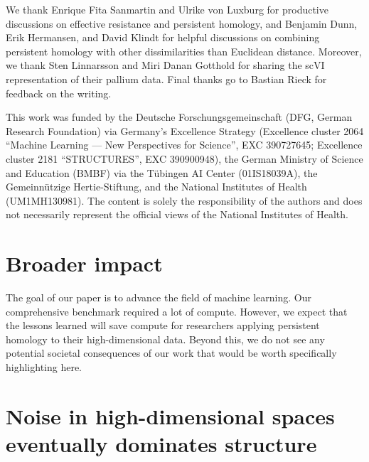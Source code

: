 \documentclass{article}
\theoremstyle{plain}
\theoremstyle{definition}
\theoremstyle{remark}
\begin{document}
\clearpage

\begin{ack}
We thank Enrique Fita Sanmartin and Ulrike von Luxburg for productive discussions on effective resistance and persistent homology, and Benjamin Dunn, Erik Hermansen, and David Klindt for helpful discussions on combining persistent homology with other dissimilarities than Euclidean distance. Moreover, we thank Sten Linnarsson and Miri Danan Gotthold for sharing the scVI representation of their pallium data. Final thanks go to Bastian Rieck for feedback on the writing.

This work was funded by the Deutsche Forschungsgemeinschaft (DFG, German Research Foundation) via Germany’s Excellence Strategy (Excellence cluster 2064 ``Machine Learning --- New Perspectives for Science'', EXC 390727645; Excellence cluster 2181 ``STRUCTURES'', EXC 390900948), the German Ministry of Science and Education (BMBF) via the T\"{u}bingen AI Center (01IS18039A), the Gemeinn\"{u}tzige Hertie-Stiftung, and the National Institutes of Health (UM1MH130981). The content is solely the responsibility of the authors and does not necessarily represent the official views of the National Institutes of Health. 
\end{ack}





\clearpage
\appendix


\renewcommand{\thefigure}{S\arabic{figure}}
\setcounter{figure}{0}

\renewcommand{\thetable}{S\arabic{table}}
\setcounter{table}{0}

\section{Broader impact}\label{app:impact}

The goal of our paper is to advance the field of machine learning. Our comprehensive benchmark required a lot of compute. However, we expect that the lessons learned will save compute for researchers applying persistent homology to their high-dimensional data. Beyond this, we do not see any potential societal consequences of our work that would be worth specifically highlighting here.


\section{Noise in high-dimensional spaces eventually dominates structure}
\label{app:dist_by_dim}
\end{document}
